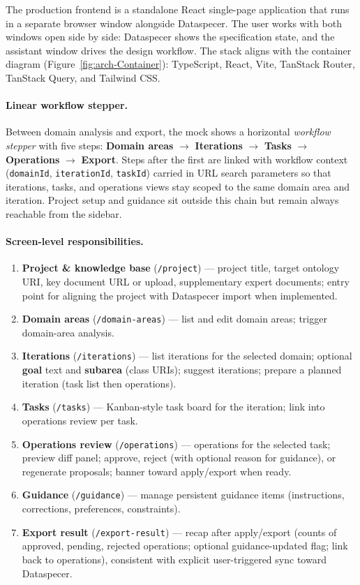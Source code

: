 \documentclass{article}
\begin{document}
The production frontend is a standalone React single-page application that runs in a separate browser window alongside Dataspecer. The user works with both windows open side by side: Dataspecer shows the specification state, and the assistant window drives the design workflow. The stack aligns with the container diagram (Figure~\ref{fig:arch-Container}): TypeScript, React, Vite, TanStack Router, TanStack Query, and Tailwind CSS.

\paragraph{Linear workflow stepper.}
Between domain analysis and export, the mock shows a horizontal \emph{workflow stepper} with five steps: \textbf{Domain areas} $\rightarrow$ \textbf{Iterations} $\rightarrow$ \textbf{Tasks} $\rightarrow$ \textbf{Operations} $\rightarrow$ \textbf{Export}. Steps after the first are linked with workflow context (\texttt{domainId}, \texttt{iterationId}, \texttt{taskId}) carried in URL search parameters so that iterations, tasks, and operations views stay scoped to the same domain area and iteration. Project setup and guidance sit outside this chain but remain always reachable from the sidebar.

\paragraph{Screen-level responsibilities.}
\begin{enumerate}
  \item \textbf{Project \& knowledge base} (\texttt{/project}) --- project title, target ontology URI, key document URL or upload, supplementary expert documents; entry point for aligning the project with Dataspecer import when implemented.
  \item \textbf{Domain areas} (\texttt{/domain-areas}) --- list and edit domain areas; trigger domain-area analysis.
  \item \textbf{Iterations} (\texttt{/iterations}) --- list iterations for the selected domain; optional \textbf{goal} text and \textbf{subarea} (class URIs); suggest iterations; prepare a planned iteration (task list then operations).
  \item \textbf{Tasks} (\texttt{/tasks}) --- Kanban-style task board for the iteration; link into operations review per task.
  \item \textbf{Operations review} (\texttt{/operations}) --- operations for the selected task; preview diff panel; approve, reject (with optional reason for guidance), or regenerate proposals; banner toward apply/export when ready.
  \item \textbf{Guidance} (\texttt{/guidance}) --- manage persistent guidance items (instructions, corrections, preferences, constraints).
  \item \textbf{Export result} (\texttt{/export-result}) --- recap after apply/export (counts of approved, pending, rejected operations; optional guidance-updated flag; link back to operations), consistent with explicit user-triggered sync toward Dataspecer.
\end{enumerate}
\end{document}
